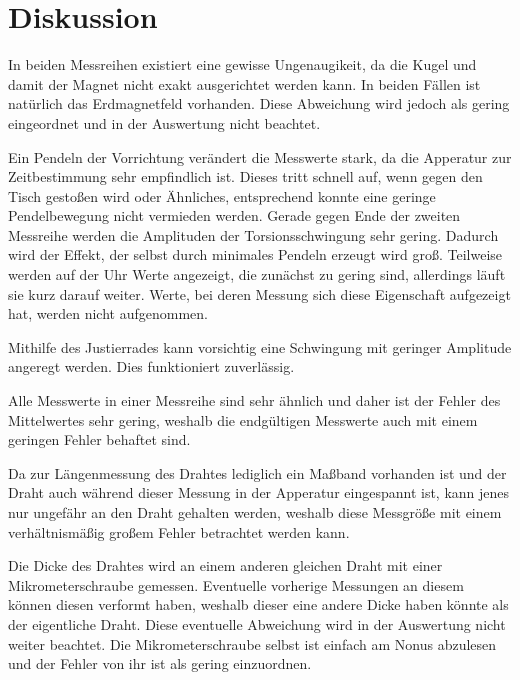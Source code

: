 \section{Diskussion}
\label{sec:Diskussion}

In beiden Messreihen existiert eine gewisse Ungenaugikeit, da die Kugel und damit der Magnet nicht exakt ausgerichtet werden kann.
In beiden Fällen ist natürlich das Erdmagnetfeld vorhanden. Diese Abweichung wird jedoch als gering eingeordnet und in der Auswertung nicht beachtet.

Ein Pendeln der Vorrichtung verändert die Messwerte stark, da die Apperatur zur Zeitbestimmung sehr empfindlich ist. Dieses tritt schnell auf, wenn gegen den Tisch gestoßen wird oder Ähnliches, entsprechend konnte eine geringe Pendelbewegung nicht vermieden werden.
Gerade gegen Ende der zweiten Messreihe werden die Amplituden der Torsionsschwingung sehr gering. Dadurch wird der Effekt, der selbst durch minimales Pendeln erzeugt wird groß.
Teilweise werden auf der Uhr Werte angezeigt, die zunächst zu gering sind, allerdings läuft sie kurz darauf weiter.
Werte, bei deren Messung sich diese Eigenschaft aufgezeigt hat, werden nicht aufgenommen.

Mithilfe des Justierrades kann vorsichtig eine Schwingung mit geringer Amplitude angeregt werden. Dies funktioniert zuverlässig.

Alle Messwerte in einer Messreihe sind sehr ähnlich und daher ist der Fehler des Mittelwertes sehr gering, weshalb die endgültigen Messwerte auch mit einem geringen Fehler behaftet sind.

Da zur Längenmessung des Drahtes lediglich ein Maßband vorhanden ist und der Draht auch während dieser Messung in der Apperatur eingespannt ist, kann jenes nur ungefähr an den Draht gehalten werden, weshalb diese Messgröße mit einem verhältnismäßig großem Fehler betrachtet werden kann.

Die Dicke des Drahtes wird an einem anderen gleichen Draht mit einer Mikrometerschraube gemessen. 
Eventuelle vorherige Messungen an diesem können diesen verformt haben, weshalb dieser eine andere Dicke haben könnte als der eigentliche Draht.
Diese eventuelle Abweichung wird in der Auswertung nicht weiter beachtet.
Die Mikrometerschraube selbst ist einfach am Nonus abzulesen und der Fehler von ihr ist als gering einzuordnen.
